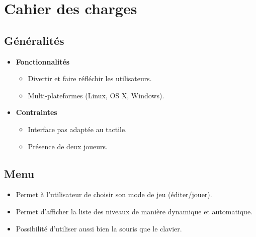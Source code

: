 %
\section{Cahier des charges}


\subsection{Généralités}

\begin{itemize}
    \item \textbf{Fonctionnalités}
    \begin{itemize}
        \item Divertir et faire réfléchir les utilisateurs.
        \item Multi-plateformes (Linux, OS X, Windows).
    \end{itemize}

    \item \textbf{Contraintes}
    \begin{itemize}
        \item Interface pas adaptée au tactile.
        \item Présence de deux joueurs.
    \end{itemize}
\end{itemize}

\subsection{Menu}

\begin{itemize}
    \item Permet à l'utilisateur de choisir son mode de jeu (éditer/jouer).
    \item Permet d'afficher la liste des niveaux de manière dynamique et automatique.
    \item Possibilité d'utiliser aussi bien la souris que le clavier.
\end{itemize}

